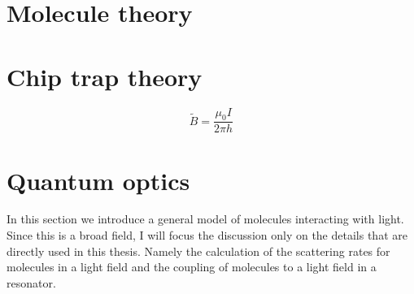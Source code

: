
\section{Molecule theory}
\label{theory:molecules}


\section{Chip trap theory}
\label{theory:chips}

\begin{equation}
  \tilde{B} = \frac{\mu_0 I}{2\pi h}
  \label{theory:eqn:height}
\end{equation}


\section{Quantum optics}
\label{theory:QO}

In this section we introduce a general model of molecules interacting with
light.  Since this is a broad field, I will focus the discussion only on the
details that are directly used in this thesis.  Namely the calculation of the
scattering rates for molecules in a light field and the coupling of molecules
to a light field in a resonator.


